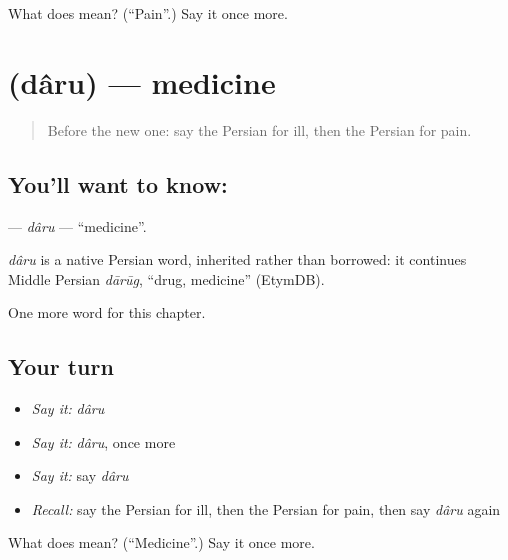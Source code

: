 \begin{tcolorbox}[breakable,colback=teal!4,colframe=teal!35!black,title={Before you move on}]
What does  mean? (\textquotedblleft{}Pain\textquotedblright{}.) Say it once more.
\end{tcolorbox}
\section[\texorpdfstring{\fa{دارو} (dâru)}{دارو (dâru)}]{ (dâru) — medicine}

\label{lesson:FA-C31-daru}



\begin{quote}
Before the new one: say the Persian for ill, then the Persian for pain.
\end{quote}

\subsection*{You'll want to know: }
\textbf{} — \emph{dâru} — \textquotedblleft{}medicine\textquotedblright{}.

\begin{cousinweb}
\emph{dâru} is a native Persian word, inherited rather than borrowed: it continues Middle Persian \emph{dārūg}, \textquotedblleft{}drug, medicine\textquotedblright{} (EtymDB).
\end{cousinweb}

\begin{grammarlens}[title={What you've built}]
One more word for this chapter.
\end{grammarlens}

\subsection*{Your turn}
\begin{itemize}
\raggedright
  \item \emph{Say it:} \emph{dâru}
  \item \emph{Say it:} \emph{dâru}, once more
  \item \emph{Say it:} say \emph{dâru}
  \item \emph{Recall:} say the Persian for ill, then the Persian for pain, then say \emph{dâru} again
\end{itemize}

\begin{tcolorbox}[breakable,colback=teal!4,colframe=teal!35!black,title={Before you move on}]
What does  mean? (\textquotedblleft{}Medicine\textquotedblright{}.) Say it once more.
\end{tcolorbox}
